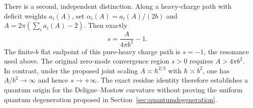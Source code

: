 There is a second, independent distinction. Along a heavy-charge
path with deficit weights $a_i(A)$, set
$\alpha_i(A)=a_i(A)/(2b)$ and
$A=2\pi(\sum_i a_i(A)-2)$. Then exactly
\begin{equation}
 \boxed{\quad s=\frac{A}{4\pi b^2}-1.\quad}
 \label{eq:areaLiouvillecharge}
\end{equation}
The finite-$b$ flat endpoint of this pure-heavy charge path is
$s=-1$, the resonance used
above. The original zero-mode convergence region $s>0$
requires $A>4\pi b^2$. In contrast, under the proposed joint
scaling $A\asymp\hbar^{2/3}$ with $\hbar\asymp b^2$, one
has $A/b^2\to\infty$ and hence $s\to+\infty$.
The exact residue identity therefore establishes a quantum
origin for the Deligne--Mostow curvature without proving the
uniform quantum degeneration proposed in
Section~\ref{sec:quantumdegeneration}.


